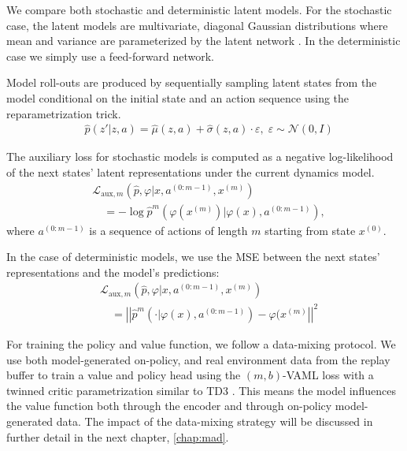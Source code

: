 We compare both stochastic and deterministic latent models.
For the stochastic case, the latent models are multivariate, diagonal Gaussian distributions where mean and variance are parameterized by the latent network \cite{pets,janner2019mbpo,paster2021blast}.
In the deterministic case we simply use a feed-forward network.
 
Model roll-outs are produced by sequentially sampling latent states from the model conditional on the initial state and an action sequence using the reparametrization trick. 
\begin{align}
&\hat{p}(\hat{z}'|z,a)=\hat{\mu}(z,a) + \hat{\sigma}(z,a)\cdot\varepsilon,\; \varepsilon \sim \mathcal{N}(0,I)
\end{align}

The auxiliary loss for stochastic models is computed as a negative log-likelihood of the next states' latent representations under the current dynamics model.
\begin{align}
    &\mathcal{L}_{\mathrm{aux},m}\left(\hat{p},\varphi\Big|x,a^{(0:m-1)},x^{(m)}\right) \nonumber\\
    &\quad =-\log \hat{p}^m\left(\varphi(x^{(m)})\Big|\varphi(x),a^{(0:m-1)}\right),
\end{align}
where $a^{(0:m-1)}$ is a sequence of actions of length $m$ starting from state $x^{(0)}$.

In the case of deterministic models, we use the MSE between the next states' representations and the model's predictions:
\begin{align}
    &\mathcal{L}_{\mathrm{aux},m}\left(\hat{p},\varphi\Big|x,a^{(0:m-1)},x^{(m)}\right) \nonumber\\
    &\quad =\left|\left|\hat{p}^m\left(\cdot\Big|\varphi(x),a^{(0:m-1)}\right)-\varphi(x^{(m)}\right|\right|^2
\end{align}

For training the policy and value function, we follow a data-mixing protocol.
We use both model-generated on-policy, and real environment data from the replay buffer to train a value and policy head using the $(m,b)$-VAML loss with a twinned critic parametrization similar to TD3  \cite{fujimoto2018addressing}.
This means the model influences the value function both through the encoder and through on-policy model-generated data.
The impact of the data-mixing strategy will be discussed in further detail in the next chapter, \autoref{chap:mad}.

